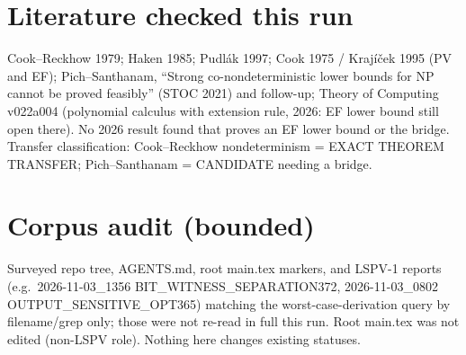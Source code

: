 \documentclass[11pt]{article}
\begin{document}
\section{Literature checked this run}
Cook--Reckhow 1979; Haken 1985; Pudl\'ak 1997; Cook 1975 / Krajíček 1995 (PV and EF); Pich--Santhanam, ``Strong co-nondeterministic lower bounds for NP cannot be proved feasibly'' (STOC 2021) and follow-up; Theory of Computing v022a004 (polynomial calculus with extension rule, 2026: EF lower bound still open there). No 2026 result found that proves an EF lower bound or the bridge. Transfer classification: Cook--Reckhow nondeterminism = EXACT THEOREM TRANSFER; Pich--Santhanam = CANDIDATE needing a bridge.

\section{Corpus audit (bounded)}
Surveyed repo tree, AGENTS.md, root main.tex markers, and LSPV-1 reports (e.g.\ 2026-11-03\_1356 BIT\_WITNESS\_SEPARATION372, 2026-11-03\_0802 OUTPUT\_SENSITIVE\_OPT365) matching the worst-case-derivation query by filename/grep only; those were not re-read in full this run. Root main.tex was not edited (non-LSPV role). Nothing here changes existing statuses.
\end{document}
